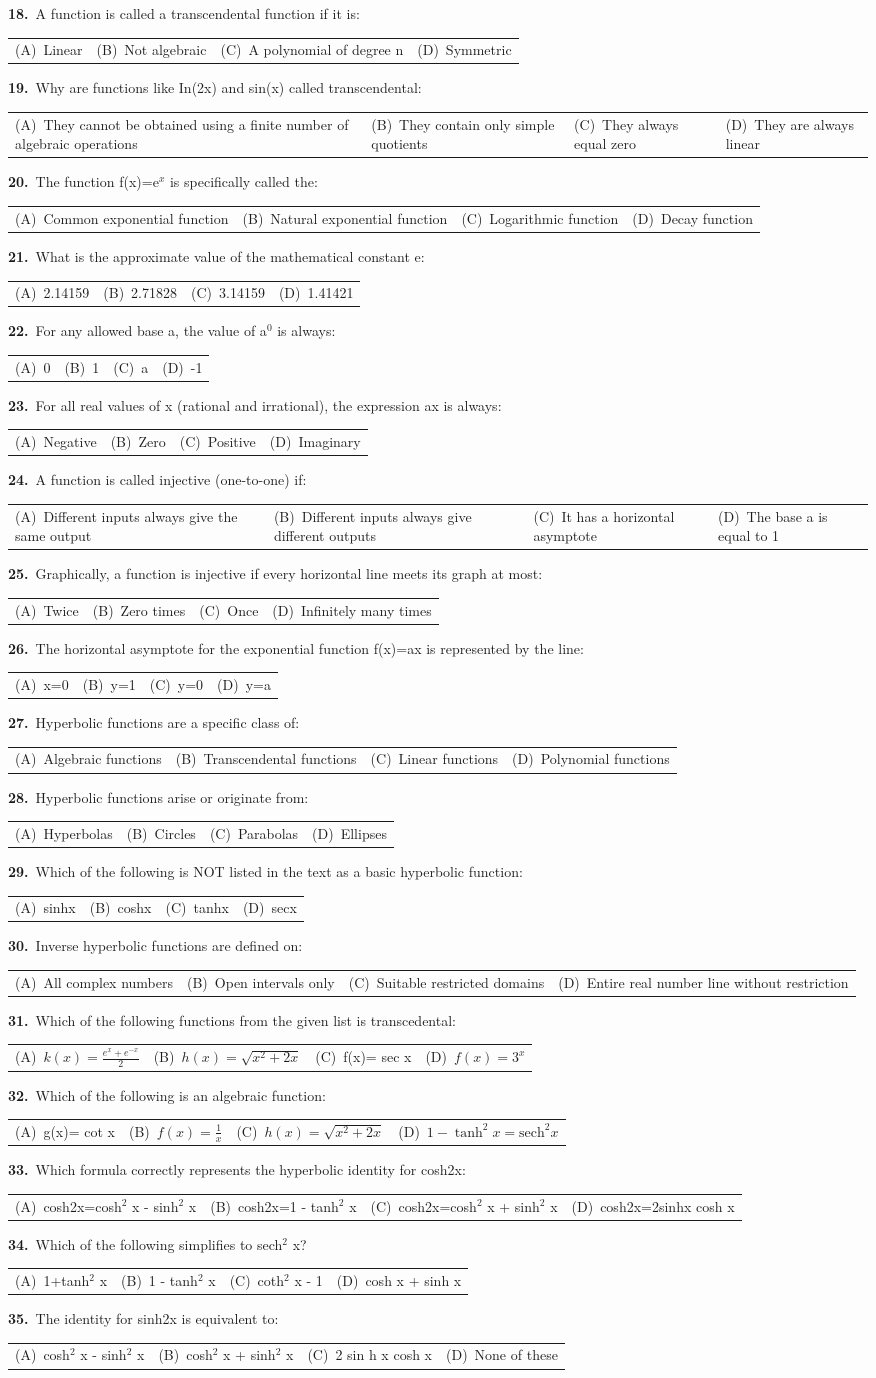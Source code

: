 \documentclass[11pt,a4paper]{article}
\makeatletter
\newcommand{\mcq}[6]{%
  \Needspace{4\baselineskip}%
  \par\medskip\noindent\textbf{#1.}\ #2\par\nopagebreak
  \noindent\begin{tabularx}{\linewidth}{@{\hspace{1.5em}}*{4}{>{\raggedright\arraybackslash}X}@{}}
    (A)~#3 & (B)~#4 & (C)~#5 & (D)~#6
  \end{tabularx}\par}
\makeatother
\begin{document}
\mcq{18}{A function is called a transcendental function if it is:}{Linear}{Not algebraic}{A polynomial of degree n}{Symmetric}
\mcq{19}{Why are functions like In(2x) and sin(x) called transcendental:}{They cannot be obtained using a finite number of algebraic operations}{They contain only simple quotients}{They always equal zero}{They are always linear}
\mcq{20}{The function f(x)=e$^{x}$ is specifically called the:}{Common exponential function}{Natural exponential function}{Logarithmic function}{Decay function}
\mcq{21}{What is the approximate value of the mathematical constant e:}{2.14159}{2.71828}{3.14159}{1.41421}
\mcq{22}{For any allowed base a, the value of a$^{0}$ is always:}{0}{1}{a}{-1}
\mcq{23}{For all real values of x (rational and irrational), the expression ax is always:}{Negative}{Zero}{Positive}{Imaginary}
\mcq{24}{A function is called injective (one-to-one) if:}{Different inputs always give the same output}{Different inputs always give different outputs}{It has a horizontal asymptote}{The base a is equal to 1}
\mcq{25}{Graphically, a function is injective if every horizontal line meets its graph at most:}{Twice}{Zero times}{Once}{Infinitely many times}
\mcq{26}{The horizontal asymptote for the exponential function f(x)=ax is represented by the line:}{x=0}{y=1}{y=0}{y=a}
\mcq{27}{Hyperbolic functions are a specific class of:}{Algebraic functions}{Transcendental functions}{Linear functions}{Polynomial functions}
\mcq{28}{Hyperbolic functions arise or originate from:}{Hyperbolas}{Circles}{Parabolas}{Ellipses}
\mcq{29}{Which of the following is NOT listed in the text as a basic hyperbolic function:}{sinhx}{coshx}{tanhx}{secx}
\mcq{30}{Inverse hyperbolic functions are defined on:}{All complex numbers}{Open intervals only}{Suitable restricted domains}{Entire real number line without restriction}
\mcq{31}{Which of the following functions from the given list is transcedental:}{$k(x)=\frac{e^{x}+e^{-x}}{2}$}{$h(x)=\sqrt{x^{2}+2x}$}{f(x)= sec x}{$f(x)=3^{x}$}
\mcq{32}{Which of the following is an algebraic function:}{g(x)= cot x}{$f(x)=\frac{1}{x}$}{$h(x)=\sqrt{x^{2}+2x}$}{$1-\tanh^{2}x=\mathrm{sech}^{2}x$}
\mcq{33}{Which formula correctly represents the hyperbolic identity for cosh2x:}{cosh2x=cosh$^{2}$ x - sinh$^{2}$ x}{cosh2x=1 - tanh$^{2}$ x}{cosh2x=cosh$^{2}$ x + sinh$^{2}$ x}{cosh2x=2sinhx cosh x}
\mcq{34}{Which of the following simplifies to sech$^{2}$ x?}{1+tanh$^{2}$ x}{1 - tanh$^{2}$ x}{coth$^{2}$ x - 1}{cosh x + sinh x}
\mcq{35}{The identity for sinh2x is equivalent to:}{cosh$^{2}$ x - sinh$^{2}$ x}{cosh$^{2}$ x + sinh$^{2}$ x}{2 sin h x cosh x}{None of these}
\end{document}
